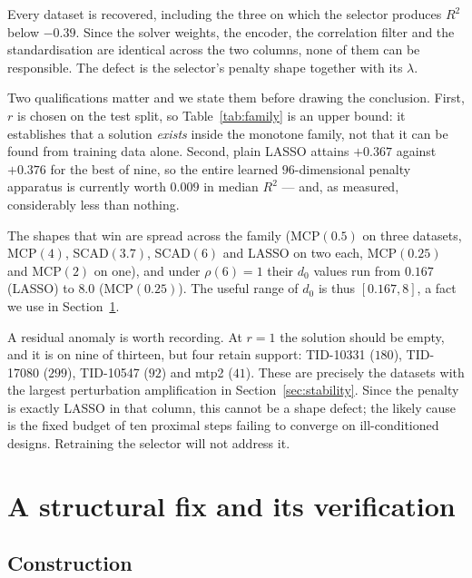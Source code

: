 \documentclass[11pt]{article}
\begin{document}
Every dataset is recovered, including the three on which the selector produces
$R^2$ below $-0.39$. Since the solver weights, the encoder, the correlation
filter and the standardisation are identical across the two columns, none of
them can be responsible. The defect is the selector's penalty shape together
with its $\lambda$.

Two qualifications matter and we state them before drawing the conclusion.
First, $r$ is chosen on the test split, so Table~\ref{tab:family} is an upper
bound: it establishes that a solution \emph{exists} inside the monotone family,
not that it can be found from training data alone. Second, plain LASSO attains
$+0.367$ against $+0.376$ for the best of nine, so the entire learned
$96$-dimensional penalty apparatus is currently worth $0.009$ in median
$R^2$ --- and, as measured, considerably less than nothing.

The shapes that win are spread across the family (MCP$(0.5)$ on three
datasets, MCP$(4)$, SCAD$(3.7)$, SCAD$(6)$ and LASSO on two each, MCP$(0.25)$
and MCP$(2)$ on one), and under $\rho(6)=1$ their $d_0$ values run from
$0.167$ (LASSO) to $8.0$ (MCP$(0.25)$). The useful range of $d_0$ is thus
$[0.167, 8]$, a fact we use in Section~\ref{sec:monotone}.

A residual anomaly is worth recording. At $r = 1$ the solution should be
empty, and it is on nine of thirteen, but four retain support:
TID-10331 ($180$), TID-17080 ($299$), TID-10547 ($92$) and mtp2 ($41$). These
are precisely the datasets with the largest perturbation amplification in
Section~\ref{sec:stability}. Since the penalty is exactly LASSO in that
column, this cannot be a shape defect; the likely cause is the fixed budget of
ten proximal steps failing to converge on ill-conditioned designs. Retraining
the selector will not address it.

\section{A structural fix and its verification}
\label{sec:monotone}

\subsection{Construction}
\end{document}
